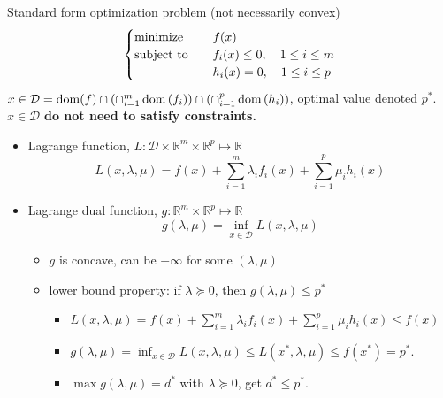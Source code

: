 \begin{remark}
    Standard form optimization problem (not necessarily convex)\[\begin{cases}
        \operatorname{minimize} \quad &f(x)\\
        \operatorname{subject\ to} \quad &f_i(x) \le 0, \quad 1 \le i \le m\\
        &h_i(x) = 0, \quad 1 \le i \le p
    \end{cases}\]
    $x \in \mathcal{D} =\operatorname{dom}(f) \cap\left(\cap_{i=1}^{m} \operatorname{dom}\left(f_{i}\right)\right) \cap\left(\cap_{i=1}^{p} \operatorname{dom}\left(h_{i}\right)\right)$, optimal value denoted $p^*$. $x \in \mathcal{D}$ \textbf{do not need to satisfy constraints.}
    \begin{itemize}
        \item Lagrange function, $L: \mathcal{D} \times \mathbb{R}^m \times \mathbb{R}^p \mapsto \mathbb{R}$ \[L(x, \lambda, \mu) = f(x) + \sum_{i = 1}^m\lambda_if_i(x) + \sum_{i = 1}^p \mu_ih_i(x)\]
        \item Lagrange dual function, $g: \mathbb{R}^m \times \mathbb{R}^p \mapsto \mathbb{R}$ \[g(\lambda, \mu) = \inf_{x \in \mathcal{D}} L(x, \lambda, \mu)\]\begin{itemize}
            \item $g$ is concave, can be $-\infty$ for some $(\lambda, \mu)$
            \item lower bound property: if $\lambda \succeq 0$, then $g(\lambda, \mu) \le p^*$\begin{itemize}
                \item $L(x, \lambda, \mu) = f(x) + \sum_{i = 1}^m\lambda_if_i(x) + \sum_{i = 1}^p \mu_ih_i(x) \le f(x)$
                \item $g(\lambda, \mu) = \inf_{x \in \mathcal{D}}L(x, \lambda, \mu) \le L(x^*, \lambda, \mu) \le f(x^*) = p^*$.
                \item $\max g(\lambda, \mu) = d^*$ with $\lambda \succeq 0$, get $d^* \le p^*$.
            \end{itemize}
        \end{itemize}
    \end{itemize}
\end{remark}

